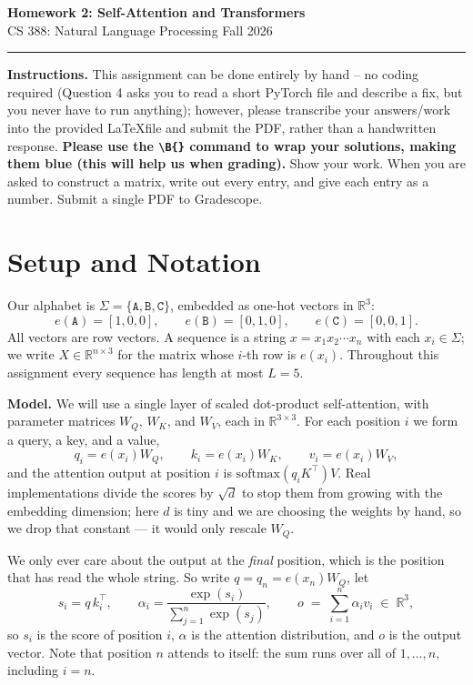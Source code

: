 \documentclass[11pt]{article}
\newcommand{\wrd}[1]{\texttt{#1}}
\newcommand{\emb}[1]{\ensuremath{e(#1)}}
\newcommand{\sm}{\ensuremath{\mathrm{softmax}}}
\newcommand{\Wq}{\ensuremath{W_Q}}
\newcommand{\Wk}{\ensuremath{W_K}}
\newcommand{\Wv}{\ensuremath{W_V}}
\begin{document}
\begin{center}
  {\Large\bfseries Homework 2: Self-Attention and Transformers}\\[2pt]
  {\normalsize CS 388: Natural Language Processing \quad\textbullet\quad Fall 2026}\\[2pt]
\end{center}
\vspace{0.5em}
\hrule
\vspace{1em}

\noindent
\textbf{Instructions.} This assignment can be done entirely by hand -- no coding required (Question 4 asks you to read a short PyTorch file and describe a fix, but you never have to run anything); however, please transcribe your answers/work into the provided \LaTeX file and submit the PDF, rather than a handwritten response.
\textbf{Please use the {\tt{\textbackslash B\{\}}} command to wrap your solutions, making them blue (this will help us when grading).}
Show your work. When you are asked to construct a matrix, write out every entry, and give each entry as a
number. Submit a single PDF to Gradescope.

\section*{Setup and Notation}

Our alphabet is $\Sigma = \{\wrd{A}, \wrd{B}, \wrd{C}\}$, embedded as one-hot vectors in $\mathbb{R}^3$:
\[
\emb{\wrd{A}} = [1,0,0], \qquad \emb{\wrd{B}} = [0,1,0], \qquad \emb{\wrd{C}} = [0,0,1].
\]
All vectors are row vectors. A sequence is a string $x = x_1 x_2 \cdots x_n$ with each $x_i \in \Sigma$; we write
$X \in \mathbb{R}^{n \times 3}$ for the matrix whose $i$-th row is $\emb{x_i}$. Throughout this assignment
every sequence has length at most $L = 5$.

\medskip\noindent
\textbf{Model.}
We will use a single layer of scaled dot-product self-attention, with parameter matrices
$\Wq$, $\Wk$, and $\Wv$, each in $\mathbb{R}^{3\times 3}$. For each position $i$ we form a query, a key,
and a value,
\[
q_i = \emb{x_i}\Wq, \qquad k_i = \emb{x_i}\Wk, \qquad v_i = \emb{x_i}\Wv ,
\]
and the attention output at position $i$ is $\sm\!\left(q_i K^\top\right) V$. Real implementations divide the
scores by $\sqrt{d}$ to stop them from growing with the embedding dimension; here $d$ is tiny and we are
choosing the weights by hand, so we drop that constant --- it would only rescale $\Wq$.

We only ever care about the output at the \emph{final} position, which is the position that has read the whole
string. So write $q = q_n = \emb{x_n}\Wq$, let
\[
s_i = q\, k_i^{\top}, \qquad
\alpha_i = \frac{\exp(s_i)}{\sum_{j=1}^{n}\exp(s_j)}, \qquad
o \;=\; \sum_{i=1}^{n} \alpha_i v_i \;\in\; \mathbb{R}^3 ,
\]
so $s_i$ is the score of position $i$, $\alpha$ is the attention distribution, and $o$ is the output vector.
Note that position $n$ attends to itself: the sum runs over all of $1,\dots,n$, including $i = n$.
\end{document}
